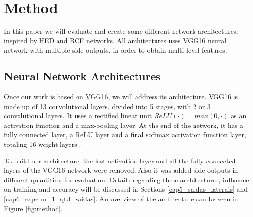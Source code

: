 \section{Method}
\label{cap5_metodologia}

{\color{blue}
In this paper we will evaluate and create some different network architectures, inspired by HED \cite{Xie:2017:HED:3158436.3158453} and RCF \cite{RCF:2017:8100105} networks. 
All architectures uses VGG16 \cite{VGGNET:2014} neural network with multiple side-outputs, in order to obtain multi-level features.
}

\subsection{Neural Network Architectures}
\label{cap5_rede_neural}

Once our work is based on VGG16, we will address its architecture.
VGG16 is made up of 13 convolutional layers, divided into 5 stages, with 2 or 3 convolutional layers.
It uses a rectified linear unit $ReLU(\cdot) = max(0, \cdot)$ as an activation function and a max-pooling layer.
At the end of the network, it has a fully connected layer, a ReLU layer and a final softmax activation function layer, totaling 16 weight layers \cite{VGGNET:2014}.


To build our architecture, the last activation layer and all the fully connected layers of the VGG16 network were removed.
Also it was added side-outputs in different quantities, for evaluation.
Details regarding these architectures, influence on training and accuracy will be discussed in Sections \ref{cap5_saidas_laterais} and \ref{cap6_experm_1_qtd_saidas}.
An overview of the architecture can be seen in Figure \ref{fig:method}.

